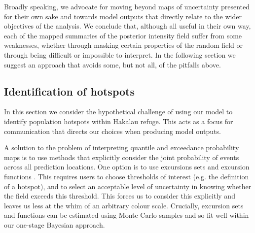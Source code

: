 \documentclass{statsoc}
\begin{document}
Broadly speaking, we advocate for moving beyond maps of uncertainty presented for their own sake and towards model outputs that directly relate to the wider objectives of the analysis. We conclude that, although all useful in their own way, each of the mapped summaries of the posterior intensity field suffer from some weaknesses, whether through masking certain properties of the random field or through being difficult or impossible to interpret. In the following section we suggest an approach that avoids some, but not all, of the pitfalls above.

\subsection{Identification of hotspots}

In this section we consider the hypothetical challenge of using our model to identify population hotspots within Hakalau refuge.  This acts as a focus for communication that directs our choices when producing model outputs.

A solution to the problem of interpreting quantile and exceedance probability maps is to use methods that explicitly consider the joint probability of events across all prediction locations. One option is to use excursions sets and excursion functions \citep{bolin_excursion_2015}.  This requires users to choose thresholds of interest (e.g. the definition of a hotspot), and to select an acceptable level of uncertainty in knowing whether the field exceeds this threshold.  This forces us to consider this explicitly and leaves us less at the whim of an arbitrary colour scale.  Crucially, excursion sets and functions can be estimated using Monte Carlo samples and so fit well within our one-stage Bayesian approach.
\end{document}
